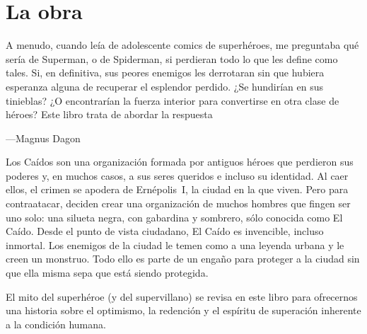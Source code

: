 \section*{La obra}
\begin{small}
	\epigraph{
		\lquoti A menudo, cuando leía de adolescente comics de superhéroes, me preguntaba qué sería de Superman, o de Spiderman, si perdieran todo lo que les define como tales. Si, en definitiva, sus peores enemigos les derrotaran sin que hubiera esperanza alguna de recuperar el esplendor perdido. ¿Se hundirían en sus tinieblas? ¿O encontrarían la fuerza interior para convertirse en otra clase de héroes? Este libro trata de abordar la respuesta\rquoti
	}{---Magnus Dagon}

	Los Caídos son una organización formada por antiguos héroes que perdieron sus poderes y, en muchos casos, a sus seres queridos e incluso su identidad. Al caer ellos, el crimen se apodera de Ernépolis~I, la ciudad en la que viven. Pero para contraatacar, deciden crear una organización de muchos hombres que fingen ser uno solo: una silueta negra, con gabardina y sombrero, sólo conocida como El Caído. Desde el punto de vista ciudadano, El Caído es invencible, incluso inmortal. Los enemigos de la ciudad le temen como a una leyenda urbana y le creen un monstruo. Todo ello es parte de un engaño para proteger a la ciudad sin que ella misma sepa que está siendo protegida.

	El mito del superhéroe (y del supervillano) se revisa en este libro para ofrecernos una historia sobre el optimismo, la redención y el espíritu de superación inherente a la condición humana.
\end{small}

\endinput